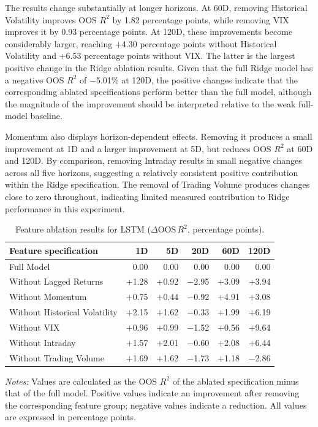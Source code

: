 \documentclass[runningheads,orivec]{llncs}
\begin{document}
The results change substantially at longer horizons. At 60D, removing Historical Volatility improves OOS $R^2$ by 1.82 percentage points, while removing VIX improves it by 0.93 percentage points. At 120D, these improvements become considerably larger, reaching $+$4.30 percentage points without Historical Volatility and $+$6.53 percentage points without VIX. The latter is the largest positive change in the Ridge ablation results. Given that the full Ridge model has a negative OOS $R^2$ of $-$5.01\% at 120D, the positive changes indicate that the corresponding ablated specifications perform better than the full model, although the magnitude of the improvement should be interpreted relative to the weak full-model baseline.

Momentum also displays horizon-dependent effects. Removing it produces a small improvement at 1D and a larger improvement at 5D, but reduces OOS $R^2$ at 60D and 120D. By comparison, removing Intraday results in small negative changes across all five horizons, suggesting a relatively consistent positive contribution within the Ridge specification. The removal of Trading Volume produces changes close to zero throughout, indicating limited measured contribution to Ridge performance in this experiment.

\begin{table}[htbp]
\centering
\caption{Feature ablation results for LSTM ($\Delta \mathrm{OOS}\,R^2$, percentage points).}\label{tab:ablation_lstm}
{\footnotesize
\setlength{\tabcolsep}{6pt}
\begin{tabular}{lrrrrr}
\hline
Feature specification & 1D & 5D & 20D & 60D & 120D \\
\hline
Full Model & 0.00 & 0.00 & 0.00 & 0.00 & 0.00 \\
Without Lagged Returns & $+$1.28 & $+$0.92 & $-$2.95 & $+$3.09 & $+$3.94 \\
Without Momentum & $+$0.75 & $+$0.44 & $-$0.92 & $+$4.91 & $+$3.08 \\
Without Historical Volatility & $+$2.15 & $+$1.62 & $-$0.33 & $+$1.99 & $+$6.19 \\
Without VIX & $+$0.96 & $+$0.99 & $-$1.52 & $+$0.56 & $+$9.64 \\
Without Intraday & $+$1.57 & $+$2.01 & $-$0.60 & $+$2.08 & $+$6.44 \\
Without Trading Volume & $+$1.69 & $+$1.62 & $-$1.73 & $+$1.18 & $-$2.86 \\
\hline
\end{tabular}
}
\par\vspace{4pt}\parbox{\linewidth}{\scriptsize\textit{Notes:} Values are calculated as the OOS $R^2$ of the ablated specification minus that of the full model. Positive values indicate an improvement after removing the corresponding feature group; negative values indicate a reduction. All values are expressed in percentage points.}
\end{table}
\end{document}
